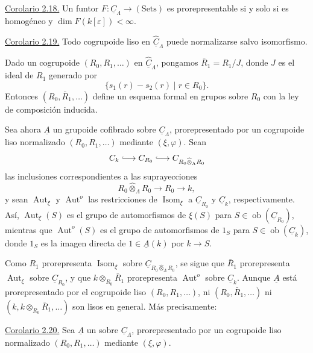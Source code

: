 
\underline{Corolario 2.18.} Un funtor
$F:\underline C_\Lambda\longrightarrow(\mathrm{Sets})$ es
prorepresentable si y solo si es homogéneo y
$\dim F(k[\varepsilon])<\infty$.

\underline{Corolario 2.19.} Todo cogrupoide liso en
$\widehat{\underline C}_\Lambda$ puede normalizarse salvo isomorfismo.

Dado un cogrupoide $(R_0,R_1,\ldots)$ en
$\widehat{\underline C}_\Lambda$, pongamos $\bar R_1=R_1/J$, donde $J$ es
el ideal de $R_1$ generado por
\[
 \{s_1(r)-s_2(r)\mid r\in R_0\}.
\]
Entonces $(R_0,\bar R_1,\ldots)$ define un esquema formal en grupos sobre
$R_0$ con la ley de composición inducida.

Sea ahora $\underline A$ un grupoide cofibrado sobre
$\underline C_\Lambda$, prorepresentado por un cogrupoide liso
normalizado $(R_0,R_1,\ldots)$ mediante $(\xi,\varphi)$. Sean
\[
 \underline C_k\lhook\joinrel\longrightarrow
 \underline C_{R_0}\lhook\joinrel\longrightarrow
 \underline C_{R_0\widehat\otimes_\Lambda R_0}
\]
las inclusiones correspondientes a las suprayecciones
\[
 R_0\widehat\otimes_\Lambda R_0\longrightarrow R_0\longrightarrow k,
\]
y sean $\operatorname{Aut}_\xi$ y $\operatorname{Aut}^{o}$ las
restricciones de $\operatorname{Isom}_\xi$ a
$\underline C_{R_0}$ y $\underline C_k$, respectivamente. Así,
$\operatorname{Aut}_\xi(S)$ es el grupo de automorfismos de $\xi(S)$ para
$S\in\operatorname{ob}(\underline C_{R_0})$, mientras que
$\operatorname{Aut}^{o}(S)$ es el grupo de automorfismos de $1_S$ para
$S\in\operatorname{ob}(\underline C_k)$, donde $1_S$ es la imagen
directa de $1\in\underline A(k)$ por $k\longrightarrow S$.

Como $R_1$ prorepresenta $\operatorname{Isom}_\xi$ sobre
$\underline C_{R_0\widehat\otimes_\Lambda R_0}$, se sigue que
$\bar R_1$ prorepresenta $\operatorname{Aut}_\xi$ sobre
$\underline C_{R_0}$, y que
$k\otimes_{R_0}\bar R_1$ prorepresenta $\operatorname{Aut}^{o}$ sobre
$\underline C_k$. Aunque $\underline A$ está prorepresentado por el
cogrupoide liso $(R_0,R_1,\ldots)$, ni
$(R_0,\bar R_1,\ldots)$ ni
$(k,k\otimes_{R_0}\bar R_1,\ldots)$ son lisos en general. Más
precisamente:

\underline{Corolario 2.20.} Sea $\underline A$ un
 sobre
$\underline C_\Lambda$, prorepresentado por un cogrupoide
liso normalizado $(R_0,R_1,\ldots)$ mediante $(\xi,\varphi)$.

